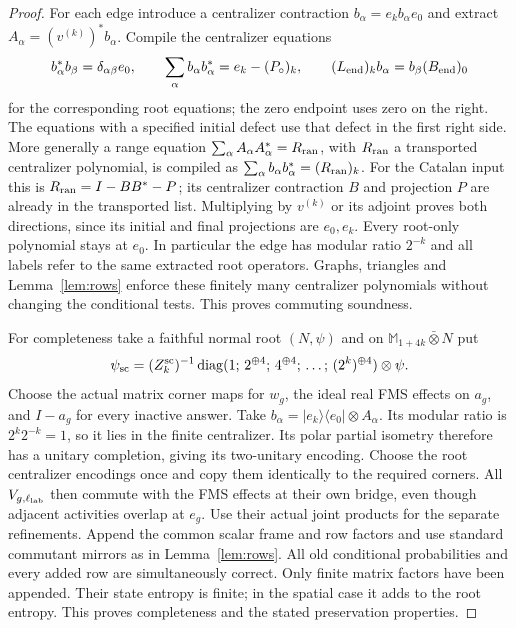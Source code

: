 \begin{proof}
For each edge introduce a centralizer contraction
$b_\alpha=e_kb_\alpha e_0$ and extract
$A_\alpha=(v^{(k)})^*b_\alpha$. Compile the centralizer equations
\[
 b_\alpha^*b_\beta=\delta_{\alpha\beta}e_0,\qquad
 \sum_\alpha b_\alpha b_\alpha^*=e_k-(P_\circ)_k,
 \qquad (L_{\rm end})_kb_\alpha=b_\beta (B_{\rm end})_0
\]
for the corresponding root equations; the zero endpoint uses zero
on the right. The equations with a specified initial defect use
that defect in the first right side. More generally a range equation
$\sum_\alpha A_\alpha A_\alpha^*=R_{\rm ran}$, with
$R_{\rm ran}$ a transported centralizer polynomial, is compiled as
$\sum_\alpha b_\alpha b_\alpha^*=(R_{\rm ran})_k$.
For the Catalan input this is $R_{\rm ran}=I-BB^*-P$; its
centralizer contraction $B$ and projection $P$ are already in the
transported list. Multiplying by $v^{(k)}$ or
its adjoint proves both directions, since its initial and final
projections are $e_0,e_k$. Every root-only polynomial stays at
$e_0$. In particular the edge has modular ratio $2^{-k}$ and all
labels refer to the same extracted root operators. Graphs,
triangles and Lemma~\ref{lem:rows} enforce these finitely many
centralizer polynomials without changing the conditional tests.
This proves commuting soundness.

For completeness take a faithful normal root $(N,\psi)$ and on
$\mathbb M_{1+4k}\bar\otimes N$ put
\[
 \psi_{\rm sc}=(Z_k^{\rm sc})^{-1}\operatorname{diag}
 (1;\,2^{\oplus4};\,4^{\oplus4};\,\ldots;\,(2^k)^{\oplus4})
 \otimes\psi.
\]
Choose the actual matrix corner maps for $w_g$, the ideal real FMS
effects on $a_g$, and $I-a_g$ for every inactive answer.
Take $b_\alpha=|e_k\rangle\langle e_0|\otimes A_\alpha$.
Its modular ratio is $2^k2^{-k}=1$, so it lies in the finite
centralizer. Its polar partial isometry therefore has a unitary
completion, giving its two-unitary encoding. Choose the root
centralizer encodings once and copy them identically to the required
corners. All $V_{g,\ell_{\rm lab}}$ then commute with the FMS effects at their
own bridge, even though adjacent activities overlap at $e_g$.
Use their actual joint products for the separate refinements.
Append the common scalar frame and row factors and use standard
commutant mirrors as in Lemma~\ref{lem:rows}. All old conditional
probabilities and every added row are simultaneously correct.
Only finite matrix factors have been appended. Their state entropy
is finite; in the spatial case it adds to the root entropy.
This proves completeness and the stated preservation properties.
\end{proof}
